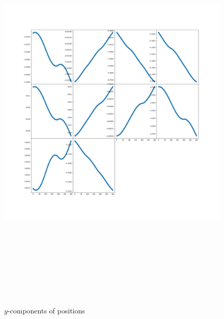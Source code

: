\documentclass[12pt]{article}
\begin{document}
	\begin{figure}[H]
		\includegraphics[width=\linewidth, height=20cm]{subpsy3Bz.png} \caption{$y$-components of positions} \label{subpsy3Bz}
	\end{figure}
\end{document}
